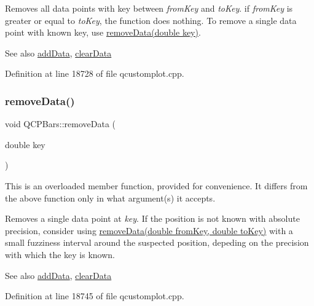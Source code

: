 Removes all data points with key between {\itshape from\+Key} and {\itshape to\+Key}. if {\itshape from\+Key} is greater or equal to {\itshape to\+Key}, the function does nothing. To remove a single data point with known key, use \hyperlink{class_q_c_p_bars_a837cc9848ad3edd40a6130b508493f93}{remove\+Data(double key)}.

\begin{DoxySeeAlso}{See also}
\hyperlink{class_q_c_p_bars_a1f29cf08615040993209147fa68de3f2}{add\+Data}, \hyperlink{class_q_c_p_bars_a11dbbd707132f07f862dff13c5789c2b}{clear\+Data} 
\end{DoxySeeAlso}


Definition at line 18728 of file qcustomplot.\+cpp.

\mbox{\label{class_q_c_p_bars_a837cc9848ad3edd40a6130b508493f93}} 
\subsubsection{\texorpdfstring{remove\+Data()}{removeData()}\hspace{0.1cm}{\footnotesize\ttfamily [2/2]}}
{\footnotesize\ttfamily void Q\+C\+P\+Bars\+::remove\+Data (\begin{DoxyParamCaption}\item[{double}]{key }\end{DoxyParamCaption})}

This is an overloaded member function, provided for convenience. It differs from the above function only in what argument(s) it accepts.

Removes a single data point at {\itshape key}. If the position is not known with absolute precision, consider using \hyperlink{class_q_c_p_bars_a1fe9bcb57d670defea1bb65cadf43765}{remove\+Data(double from\+Key, double to\+Key)} with a small fuzziness interval around the suspected position, depeding on the precision with which the key is known.

\begin{DoxySeeAlso}{See also}
\hyperlink{class_q_c_p_bars_a1f29cf08615040993209147fa68de3f2}{add\+Data}, \hyperlink{class_q_c_p_bars_a11dbbd707132f07f862dff13c5789c2b}{clear\+Data} 
\end{DoxySeeAlso}


Definition at line 18745 of file qcustomplot.\+cpp.

